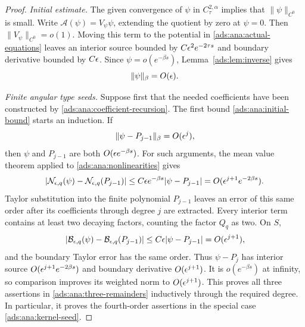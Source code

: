 \begin{proof}
\emph{Initial estimate.}
The given convergence of $\psi$ in $C^{2,\alpha}_\tau$ implies that
$\|\psi\|_{C^0}$ is small.  Write
$\mathcal A(\psi)=V_\psi\psi$, extending the quotient by zero at
$\psi=0$.  Then $\|V_\psi\|_{C^0}=o(1)$.  Moving this term to the
potential in \eqref{ads:ana:actual-equations} leaves an interior source
bounded by $C\epsilon^2e^{-2\tau s}$ and boundary derivative bounded
by $C\epsilon$.  Since $\psi=o(e^{-\beta s})$, Lemma~\ref{ads:lem:inverse}
gives
\begin{equation}
 \|\psi\|_\beta=O(\epsilon).
 \label{ads:ana:initial-bound}
\end{equation}

\emph{Finite angular type seeds.}
Suppose first that the needed coefficients have been constructed
by \eqref{ads:ana:coefficient-recursion}.  The first bound
\eqref{ads:ana:initial-bound} starts an induction.  If
\[
 \|\psi-P_{j-1}\|_\beta=O(\epsilon^j),
\]
then $\psi$ and $P_{j-1}$ are both $O(\epsilon e^{-\beta s})$.
For such arguments, the mean value theorem applied to
\eqref{ads:ana:nonlinearities} gives
\[
 |\mathcal N_{\epsilon,q}(\psi)
       -\mathcal N_{\epsilon,q}(P_{j-1})|
 \leq C\epsilon e^{-\beta s}|\psi-P_{j-1}|
 =O(\epsilon^{j+1}e^{-2\beta s}).
\]
Taylor substitution into the finite polynomial $P_{j-1}$ leaves
an error of this same order after its coefficients through degree $j$
are extracted.  Every interior term contains at least two decaying
factors, counting the factor $Q_q$ as two.  On $S$,
\[
 |\mathcal B_{\epsilon,q}(\psi)
       -\mathcal B_{\epsilon,q}(P_{j-1})|
 \leq C\epsilon|\psi-P_{j-1}|=O(\epsilon^{j+1}),
\]
and the boundary Taylor error has the same order.  Thus
$\psi-P_j$ has interior source
$O(\epsilon^{j+1}e^{-2\beta s})$ and boundary derivative
$O(\epsilon^{j+1})$.  It is $o(e^{-\beta s})$ at infinity, so comparison
improves its weighted norm to $O(\epsilon^{j+1})$.
This proves all three assertions in \eqref{ads:ana:three-remainders}
inductively through the required degree.  In particular, it proves
the fourth-order assertions in the special case
\eqref{ads:ana:kernel-seed}.


\end{proof}
